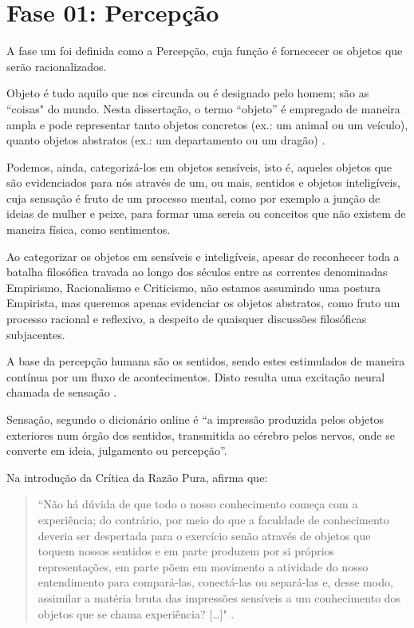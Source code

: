 \section{\hspace*{3pt} Fase 01: Percepção}
\label{sec:percepcao}

A fase um foi definida como a Percepção, cuja função é fornececer os objetos que serão racionalizados. 

Objeto é tudo aquilo que nos circunda ou é designado pelo homem; são as ``coisas" do mundo. Nesta dissertação, o termo ``objeto” é empregado de maneira ampla e pode representar tanto objetos concretos (ex.: um animal ou um veículo), quanto objetos abstratos (ex.: um departamento ou um dragão) \citep{dahlberg:1978.teoria, machado:2009.projeto}. 

Podemos, ainda, categorizá-los em objetos sensíveis, isto é, aqueles objetos que são evidenciados para nós através de um, ou mais, sentidos e objetos inteligíveis, cuja sensação é fruto de um processo mental, como por exemplo a junção de ideias de mulher e peixe, para formar uma sereia ou conceitos que não existem de maneira física, como sentimentos. 

Ao categorizar os objetos em sensíveis e inteligíveis, apesar de reconhecer toda a batalha filosófica travada ao longo dos séculos entre as correntes denominadas Empirismo, Racionalismo e Criticismo, não estamos assumindo uma postura Empirista, mas queremos apenas evidenciar os objetos abstratos, como fruto um processo racional e reflexivo, a despeito de quaisquer discussões filosóficas subjacentes. 

A base da percepção humana são os sentidos, sendo estes estimulados de maneira contínua por um fluxo de acontecimentos. Disto resulta uma excitação neural chamada de sensação \citep{alexandre:2007.factores}.

Sensação, segundo o dicionário online \citet{priberam:2015} é ``a impressão produzida pelos objetos exteriores num órgão dos sentidos, transmitida ao cérebro pelos nervos, onde se converte em ideia, julgamento ou percepção''.

Na introdução da Crítica da Razão Pura, \citet{kant:1983.critica} afirma que: 

\begin{quote}
``Não há dúvida de que todo o nosso conhecimento começa com a experiência; do contrário, por meio do que a faculdade de conhecimento deveria ser despertada para o exercício senão através de objetos que toquem nossos sentidos e em parte produzem por si próprios representações, em parte põem em movimento a atividade do nosso entendimento para compará-las, conectá-las ou separá-las e, desse modo, assimilar a matéria bruta das impressões sensíveis a um conhecimento dos objetos que se chama experiência? […]" \citep[p.23]{kant:1983.critica}.
\end{quote}
 
